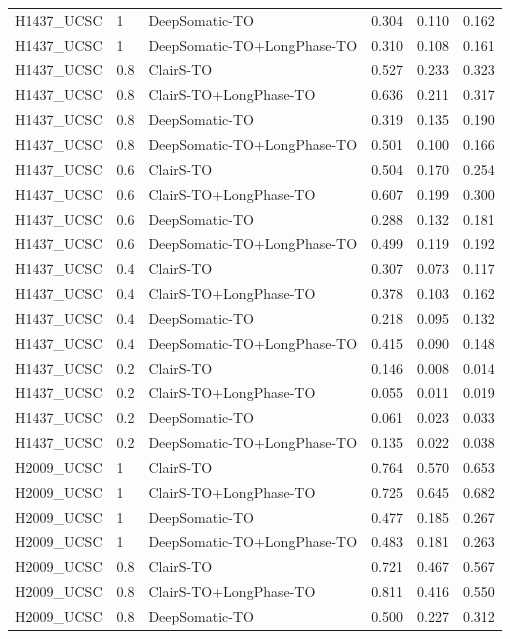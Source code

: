 \documentclass[pdflatex,sn-nature]{sn-jnl}
\begin{document}
{\begin{longtable}{@{}lllccc@{}}
  H1437\_UCSC & 1 & DeepSomatic-TO & 0.304 & 0.110 & 0.162 \\
  H1437\_UCSC & 1 & DeepSomatic-TO+LongPhase-TO & 0.310 & 0.108 & 0.161 \\
  H1437\_UCSC & 0.8 & ClairS-TO & 0.527 & 0.233 & 0.323 \\
  H1437\_UCSC & 0.8 & ClairS-TO+LongPhase-TO & 0.636 & 0.211 & 0.317 \\
  H1437\_UCSC & 0.8 & DeepSomatic-TO & 0.319 & 0.135 & 0.190 \\
  H1437\_UCSC & 0.8 & DeepSomatic-TO+LongPhase-TO & 0.501 & 0.100 & 0.166 \\
  H1437\_UCSC & 0.6 & ClairS-TO & 0.504 & 0.170 & 0.254 \\
  H1437\_UCSC & 0.6 & ClairS-TO+LongPhase-TO & 0.607 & 0.199 & 0.300 \\
  H1437\_UCSC & 0.6 & DeepSomatic-TO & 0.288 & 0.132 & 0.181 \\
  H1437\_UCSC & 0.6 & DeepSomatic-TO+LongPhase-TO & 0.499 & 0.119 & 0.192 \\
  H1437\_UCSC & 0.4 & ClairS-TO & 0.307 & 0.073 & 0.117 \\
  H1437\_UCSC & 0.4 & ClairS-TO+LongPhase-TO & 0.378 & 0.103 & 0.162 \\
  H1437\_UCSC & 0.4 & DeepSomatic-TO & 0.218 & 0.095 & 0.132 \\
  H1437\_UCSC & 0.4 & DeepSomatic-TO+LongPhase-TO & 0.415 & 0.090 & 0.148 \\
  H1437\_UCSC & 0.2 & ClairS-TO & 0.146 & 0.008 & 0.014 \\
  H1437\_UCSC & 0.2 & ClairS-TO+LongPhase-TO & 0.055 & 0.011 & 0.019 \\
  H1437\_UCSC & 0.2 & DeepSomatic-TO & 0.061 & 0.023 & 0.033 \\
  H1437\_UCSC & 0.2 & DeepSomatic-TO+LongPhase-TO & 0.135 & 0.022 & 0.038 \\
  H2009\_UCSC & 1 & ClairS-TO & 0.764 & 0.570 & 0.653 \\
  H2009\_UCSC & 1 & ClairS-TO+LongPhase-TO & 0.725 & 0.645 & 0.682 \\
  H2009\_UCSC & 1 & DeepSomatic-TO & 0.477 & 0.185 & 0.267 \\
  H2009\_UCSC & 1 & DeepSomatic-TO+LongPhase-TO & 0.483 & 0.181 & 0.263 \\
  H2009\_UCSC & 0.8 & ClairS-TO & 0.721 & 0.467 & 0.567 \\
  H2009\_UCSC & 0.8 & ClairS-TO+LongPhase-TO & 0.811 & 0.416 & 0.550 \\
  H2009\_UCSC & 0.8 & DeepSomatic-TO & 0.500 & 0.227 & 0.312 \\

\end{longtable}}
\end{document}
